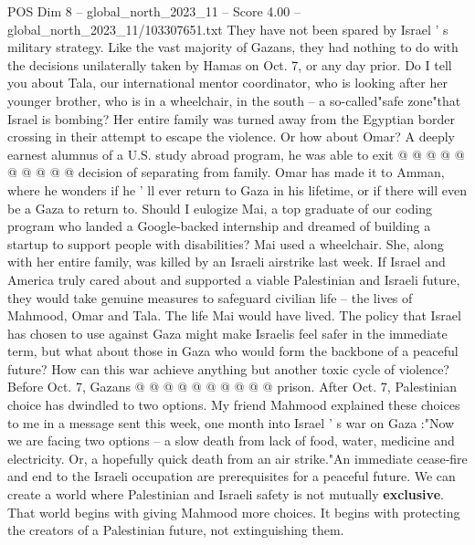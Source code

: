 \begin{textsample}{POS Dim 8 – global\_north\_2023\_11 – Score 4.00 – global\_north\_2023\_11/103307651.txt}
They have not been spared by Israel ' s military strategy.
Like the vast majority of Gazans, they had nothing to do with the decisions unilaterally taken by Hamas on Oct. 7, or any day prior.
Do I tell you about Tala, our international mentor coordinator, who is looking after her younger brother, who is in a wheelchair, in the south -- a so-called"safe zone"that Israel is bombing?
Her entire family was turned away from the Egyptian border crossing in their attempt to escape the violence.
Or how about Omar?
A deeply earnest alumnus of a U.S. study abroad program, he was able to exit @ @ @ @ @ @ @ @ @ @ decision of separating from family.
Omar has made it to Amman, where he wonders if he ' ll ever return to Gaza in his lifetime, or if there will even be a Gaza to return to.
Should I eulogize Mai, a top graduate of our coding program who landed a Google-backed internship and dreamed of building a startup to support people with disabilities?
Mai used a wheelchair.
She, along with her entire family, was killed by an Israeli airstrike last week.
If Israel and America truly cared about and supported a viable Palestinian and Israeli future, they would take genuine measures to safeguard civilian life -- the lives of Mahmood, Omar and Tala.
The life Mai would have lived.
The policy that Israel has chosen to use against Gaza might make Israelis feel safer in the immediate term, but what about those in Gaza who would form the backbone of a peaceful future?
How can this war achieve anything but another toxic cycle of violence?
Before Oct. 7, Gazans @ @ @ @ @ @ @ @ @ @ prison.
After Oct. 7, Palestinian choice has dwindled to two options.
My friend Mahmood explained these choices to me in a message sent this week, one month into Israel ' s war on Gaza :"Now we are facing two options -- a slow death from lack of food, water, medicine and electricity.
Or, a hopefully quick death from an air strike."An immediate cease-fire and end to the Israeli occupation are prerequisites for a peaceful future.
We can create a world where Palestinian and Israeli safety is not mutually \textbf{exclusive}.
That world begins with giving Mahmood more choices.
It begins with protecting the creators of a Palestinian future, not extinguishing them.

\end{textsample}
